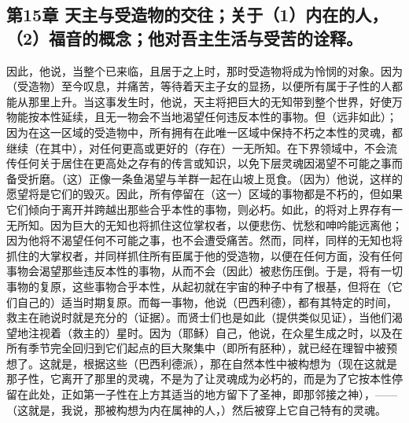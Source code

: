 
\subsection{第15章 天主与受造物的交往；关于（1）内在的人，（2）福音的概念；他对吾主生活与受苦的诠释。}

因此，他说，当整个已来临，且居于之上时，那时受造物将成为怜悯的对象。因为（受造物）至今叹息，并痛苦，等待着天主子女的显扬，以便所有属于子性的人都能从那里上升。当这事发生时，他说，天主将把巨大的无知带到整个世界，好使万物能按本性延续，且无一物会不当地渴望任何违反本性的事物。但（远非如此）；因为在这一区域的受造物中，所有拥有在此唯一区域中保持不朽之本性的灵魂，都继续（在其中），对任何更高或更好的（存在）一无所知。在下界领域中，不会流传任何关于居住在更高处之存有的传言或知识，以免下层灵魂因渴望不可能之事而备受折磨。（这）正像一条鱼渴望与羊群一起在山坡上觅食。（因为）他说，这样的愿望将是它们的毁灭。因此，所有停留在（这一）区域的事物都是不朽的，但如果它们倾向于离开并跨越出那些合乎本性的事物，则必朽。如此，的将对上界存有一无所知。因为巨大的无知也将抓住这位掌权者，以便悲伤、忧愁和呻吟能远离他；因为他将不渴望任何不可能之事，也不会遭受痛苦。然而，同样，同样的无知也将抓住的大掌权者，并同样抓住所有臣属于他的受造物，以便在任何方面，没有任何事物会渴望那些违反本性的事物，从而不会（因此）被悲伤压倒。于是，将有一切事物的复原，这些事物合乎本性，从起初就在宇宙的种子中有了根基，但将在（它们自己的）适当时期复原。而每一事物，他说（巴西利德），都有其特定的时间，救主在祂说时就是充分的（证据）。而贤士们也是如此（提供类似见证），当他们渴望地注视着（救主的）星时。因为（耶稣）自己，他说，在众星生成之时，以及在所有季节完全回归到它们起点的巨大聚集中（即所有胚种），就已经在理智中被预想了。这就是，根据这些（巴西利德派），那在自然本性中被构想为（现在这就是那子性，它离开了那里的灵魂，不是为了让灵魂成为必朽的，而是为了它按本性停留在此处，正如第一子性在上方其适当的地方留下了圣神，即那邻接之神），——（这就是，我说，那被构想为内在属神的人，）然后被穿上它自己特有的灵魂。\par

